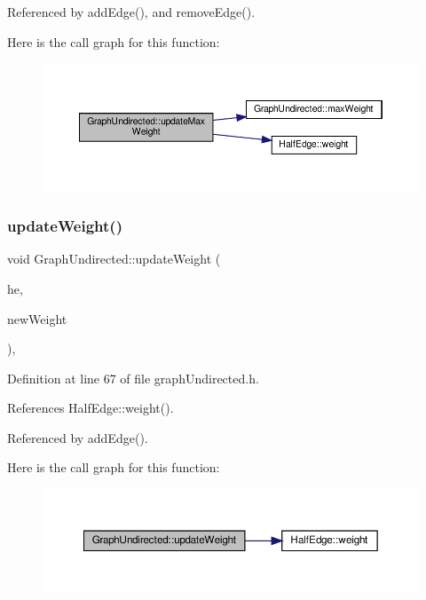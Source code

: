 Referenced by add\+Edge(), and remove\+Edge().

Here is the call graph for this function\+:\nopagebreak
\begin{figure}[H]
\begin{center}
\leavevmode
\includegraphics[width=350pt]{classGraphUndirected_a10582b249617c876bdf298f675285960_cgraph}
\end{center}
\end{figure}
\mbox{\label{classGraphUndirected_aba42cbb7de421af5452f50025154ec73}} 
\subsubsection{\texorpdfstring{update\+Weight()}{updateWeight()}}
{\footnotesize\ttfamily void Graph\+Undirected\+::update\+Weight (\begin{DoxyParamCaption}\item[{\hyperlink{classHalfEdge}{Half\+Edge} \&}]{he,  }\item[{const \hyperlink{edge_8h_a2e7ea3be891ac8b52f749ec73fee6dd2}{type\+Weight} \&}]{new\+Weight }\end{DoxyParamCaption})\hspace{0.3cm}{\ttfamily [inline]}, {\ttfamily [private]}}



Definition at line 67 of file graph\+Undirected.\+h.



References Half\+Edge\+::weight().



Referenced by add\+Edge().

Here is the call graph for this function\+:\nopagebreak
\begin{figure}[H]
\begin{center}
\leavevmode
\includegraphics[width=350pt]{classGraphUndirected_aba42cbb7de421af5452f50025154ec73_cgraph}
\end{center}
\end{figure}
\mbox{\label{classGraphUndirected_adf50305970536f71586f8f63462dfcdc}} 
